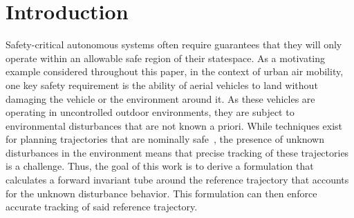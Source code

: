 \documentclass[preprint,12pt]{elsarticle}
\begin{document}
\section{Introduction}
\label{section:introduction}
Safety-critical autonomous systems often require guarantees that they will only operate within an allowable safe region of their statespace.
As a motivating example considered throughout this paper, in the context of urban air mobility, one key safety requirement is the ability of aerial vehicles to land without damaging the vehicle or the environment around it. As these vehicles are operating in uncontrolled outdoor environments, they are subject to environmental disturbances that are not known a priori. While techniques exist for planning trajectories that are nominally safe~\cite{heidari2021trajectory}, 
the presence of unknown disturbances in the environment means that precise tracking of these trajectories is a challenge. Thus, the goal of this work is to derive a formulation that calculates a forward invariant tube around the reference trajectory that accounts for the unknown disturbance behavior. This formulation can then enforce accurate tracking of said reference trajectory.
\end{document}
